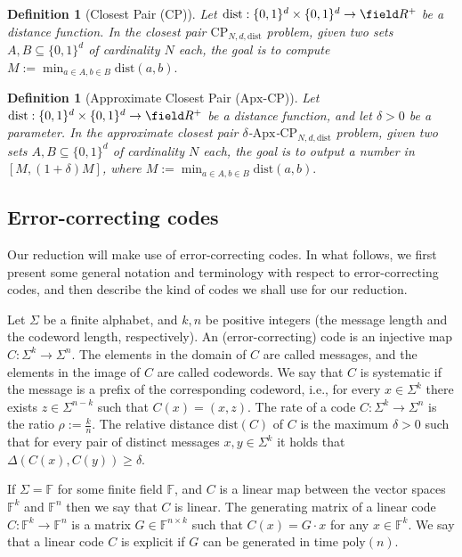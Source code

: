 \documentclass[11pt]{article}
\theoremstyle{plain}
\newtheorem{defn}[thm]{Definition}
\theoremstyle{remark}
\newcommand{\F}{\mathbb{F}}
\newcommand{\CP}{\mathrm{CP}}
\newcommand{\Apx}{\mathrm{Apx}}
\newcommand{\dist}{\mathrm{dist}}
\newcommand{\poly}{\mathrm{poly}}
\begin{document}
\begin{defn}[Closest Pair ($\CP$)] 
Let $\dist:\{0,1\}^d \times\{0,1\}^d \to\field R^+$ be a distance function. In the \textsf{closest pair  $\CP_{N,d,\dist}$ problem},
given two sets $A, B\subseteq\{0,1\}^d$
of cardinality $N$ each, the goal is to compute 
$M:=\min_{a \in A, b \in B} \dist(a,b).$
\end{defn}


\begin{defn}[Approximate Closest Pair ($\Apx$-$\CP$)] 
Let $\dist:\{0,1\}^d \times\{0,1\}^d \to\field R^+$ be a distance function, and let $\delta>0$ be a parameter. In the \textsf{approximate closest pair  $\delta$-$\Apx$-$\CP_{N,d,\dist}$ problem},
given two sets $A, B\subseteq\{0,1\}^d$
of cardinality $N$ each, the goal is to output a number
in $[M, (1+\delta)M]$, where 
$M:=\min_{a \in A, b \in B} \dist(a,b).$
\end{defn}


\subsection{Error-correcting codes}

Our reduction will make use of error-correcting codes. In what follows, we first present some general notation and terminology with respect to error-correcting codes, and then describe the kind of codes we shall use for our reduction.

Let $\Sigma$ be a finite alphabet, and $k, n$ be positive integers (the \textsf{message length} and the
\textsf{codeword length}, respectively). An \textsf{(error-correcting) code} is an injective map $C: \Sigma^k \to \Sigma^n$. The elements in the domain of $C$ are called \textsf{messages}, and the elements in the image of $C$ are called \textsf{codewords}.
We say that $C$ is \textsf{systematic} if the message is a prefix of
the corresponding codeword, i.e., for every $x \in \Sigma^k$ there
exists $z \in \Sigma^{n-k}$ such that $C(x) = (x,z)$.
The \textsf{rate} of a code $C: \Sigma^k \to \Sigma^n$ is the ratio
$\rho := \frac{k} {n}$.  The \textsf{relative distance} $\dist(C)$ of
$C$ is the maximum $\delta >0$ such that for every pair of distinct
messages $x,y\in \Sigma^k$ it holds that $\Delta(C(x),C(y))\ge\delta$.

If $\Sigma=\F$ for some finite field $\F$, and $C$ is a linear map
between the vector spaces $\F^k$ and $\F^n$ then we say that $C$ is
\textsf{linear}. The \textsf{generating matrix} of a linear code
$C: \F^k \to \F^n$ is a matrix $G \in \F^{n \times k}$ such that
$C(x) = G\cdot x$ for any $x\in \F^k$. We say that a linear code $C$ is \textsf{explicit} if 
$G$ can be generated in time $\poly(n)$. 
\end{document}
